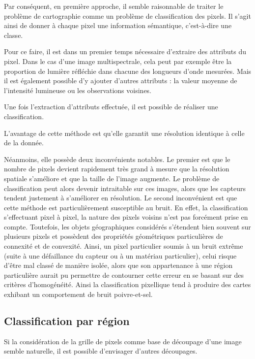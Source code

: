 Par conséquent, en première approche, il semble raisonnable de traiter le problème de cartographie comme un problème de classification des pixels. Il s'agit ainsi de donner à chaque pixel une information sémantique, c'est-à-dire une classe.

Pour ce faire, il est dans un premier temps nécessaire d'extraire des attributs du pixel. Dans le cas d'une image multispectrale, cela peut par exemple être la proportion de lumière réfléchie dans chacune des longueurs d'onde mesurées. Mais il est également possible d'y ajouter d'autres attributs : la valeur moyenne de l'intensité lumineuse ou les observations voisines.

Une fois l'extraction d'attributs effectuée, il est possible de réaliser une classification.

L'avantage de cette méthode est qu'elle garantit une résolution identique à celle de la donnée.

Néanmoins, elle possède deux inconvénients notables. Le premier est que le nombre de pixels devient rapidement très grand à mesure que la résolution spatiale s'améliore et que la taille de l'image augmente. Le problème de classification peut alors devenir intraitable sur ces images, alors que les capteurs tendent justement à s'améliorer en résolution.
Le second inconvénient est que cette méthode est particulièrement susceptible au bruit. En effet, la classification s'effectuant pixel à pixel, la nature des pixels voisins n'est pas forcément prise en compte. Toutefois, les objets géographiques considérés s'étendent bien souvent sur plusieurs pixels et possèdent des propriétés géométriques particulières de connexité et de convexité. Ainsi, un pixel particulier soumis à un bruit extrême (suite à une défaillance du capteur ou à un matériau particulier), celui risque d'être mal classé de manière isolée, alors que son appartenance à une région particulière aurait pu permettre de contourner cette erreur en se basant sur des critères d'homogénéité. Ainsi la classification pixellique tend à produire des cartes exhibant un comportement de bruit poivre-et-sel.

\subsection{Classification par région}

Si la considération de la grille de pixels comme base de découpage d'une image semble naturelle, il est possible d'envisager d'autres découpages.

